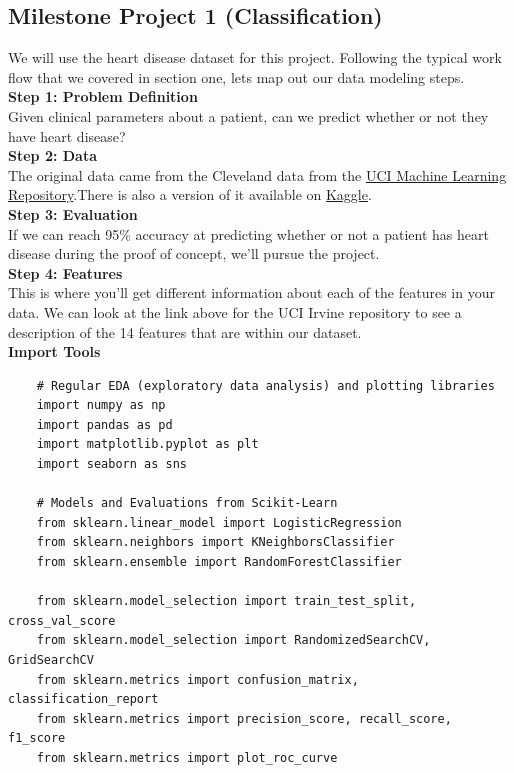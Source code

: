\documentclass[11pt, a4paper]{article}
\begin{document}
\begin{spacing}{1.1}
	\subsection{Milestone Project 1 (Classification)}
	We will use the heart disease dataset for this project. Following the typical work flow that we covered in section one, lets map out our data modeling steps. \vspace*{1.5mm} \\
	\textbf{Step 1: Problem Definition} \\
	Given clinical parameters about a patient, can we predict whether or not they have heart disease? \vspace*{1.5mm} \\
	\textbf{Step 2: Data} \\
	The original data came from the Cleveland data from the \href{https://archive.ics.uci.edu/ml/datasets/heart+Disease}{UCI Machine Learning Repository}.There is also a version of it available on \href{https://www.kaggle.com/ronitf/heart-disease-uci}{Kaggle}. \vspace*{1.5mm} \\
	\textbf{Step 3: Evaluation} \\
	If we can reach 95\% accuracy at predicting whether or not a patient has heart disease during the proof of concept, we'll pursue the project. \vspace*{1.5mm} \\
	\textbf{Step 4: Features} \\
	This is where you'll get different information about each of the features in your data. We can look at the link above for the UCI Irvine repository to see a description of the 14 features that are within our dataset. \vspace*{1.5mm} \\
	\textbf{Import Tools}	
	\begin{lstlisting}
	# Regular EDA (exploratory data analysis) and plotting libraries
	import numpy as np
	import pandas as pd
	import matplotlib.pyplot as plt
	import seaborn as sns
	
	# Models and Evaluations from Scikit-Learn
	from sklearn.linear_model import LogisticRegression
	from sklearn.neighbors import KNeighborsClassifier
	from sklearn.ensemble import RandomForestClassifier
	
	from sklearn.model_selection import train_test_split, cross_val_score
	from sklearn.model_selection import RandomizedSearchCV, GridSearchCV
	from sklearn.metrics import confusion_matrix, classification_report
	from sklearn.metrics import precision_score, recall_score, f1_score
	from sklearn.metrics import plot_roc_curve \end{lstlisting} \newpage


\end{spacing}
\end{document}
